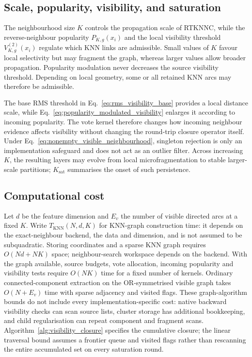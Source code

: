 \documentclass[pdflatex,sn-basic,Numbered]{sn-jnl}
\begin{document}
\subsection{Scale, popularity, visibility, and saturation}\label{sec:scale}

The neighbourhood size $K$ controls the propagation scale of RTKNNC, while
the reverse-neighbour popularity $P_{K,g}(x_i)$ and the local visibility
threshold $V^{(2)}_{K,g}(x_i)$ regulate which KNN links are admissible.
Small values of $K$ favour local selectivity but may fragment the graph,
whereas larger values allow broader propagation. Popularity modulation never
decreases the source visibility threshold. Depending on local geometry, some
or all retained KNN arcs may therefore be admissible.

The base RMS threshold in Eq.~\eqref{eq:rms_visibility_base} provides a local
distance scale, while Eq.~\eqref{eq:popularity_modulated_visibility} enlarges
it according to incoming popularity. The vote kernel therefore changes how
incoming neighbour evidence affects visibility without changing the round-trip
closure operator itself. Under Eq.~\eqref{eq:nonempty_visible_neighbourhood},
singleton rejection is only an implementation safeguard and does not act as
an outlier filter. Across increasing $K$, the resulting layers may evolve from
local microfragmentation to stable larger-scale partitions; $K_{\mathrm{sat}}$
summarises the onset of such persistence.

\subsection{Computational cost}\label{sec:computational_cost}

Let $d$ be the feature dimension and $E_v$ the number of visible directed
arcs at a fixed $K$. Write $T_{\mathrm{KNN}}(N,d,K)$ for KNN-graph
construction time: it depends on the exact-neighbour backend, the data and
dimension, and is not assumed to be subquadratic. Storing coordinates and a
sparse KNN graph requires $O(Nd+NK)$ space; neighbour-search workspace depends
on the backend. With the graph available, source budgets, vote allocation,
incoming popularity and visibility tests require $O(NK)$ time for a fixed
number of kernels. Ordinary connected-component extraction on the
OR-symmetrised visible graph takes $O(N+E_v)$ time with sparse adjacency and
visited flags. These graph-algorithm bounds do not include every
implementation-specific cost: native backward visibility checks can scan
source lists, cluster storage has additional bookkeeping, and child
regularisation can repeat component and fragment scans.
Algorithm~\ref{alg:visibility_closure} specifies the cumulative closure;
the linear traversal bound assumes a frontier queue and visited flags rather
than rescanning the entire accumulated set on every saturation round.
\end{document}
